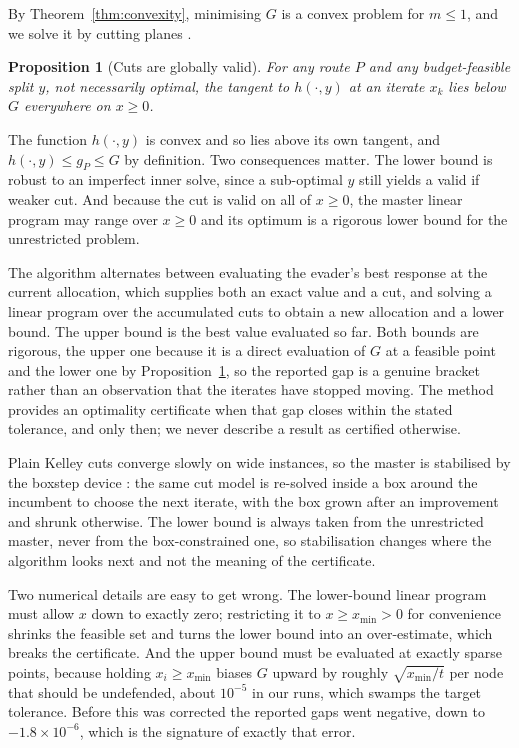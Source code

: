 \documentclass[10pt,a4paper,twoside]{article}
\theoremstyle{plain}
\newtheorem{proposition}[theorem]{Proposition}
\theoremstyle{definition}
\begin{document}
By Theorem~\ref{thm:convexity}, minimising $G$ is a convex problem for
$m\le1$, and we solve it by cutting planes \citep{kelley1960}.

\begin{proposition}[Cuts are globally valid]
\label{prop:cut-valid}
For any route $P$ and any budget-feasible split $y$, not necessarily optimal,
the tangent to $h(\cdot,y)$ at an iterate $x_k$ lies below $G$ everywhere on
$x\ge0$.
\end{proposition}

\noindent The function $h(\cdot,y)$ is convex and so lies above its own
tangent, and $h(\cdot,y)\le g_P\le G$ by definition. Two consequences
matter. The lower bound is robust to an imperfect inner solve, since a
sub-optimal $y$ still yields a valid if weaker cut. And because the cut is
valid on all of $x\ge0$, the master linear program may range over $x\ge0$ and
its optimum is a rigorous lower bound for the unrestricted problem.

The algorithm alternates between evaluating the evader's best response at the
current allocation, which supplies both an exact value and a cut, and solving
a linear program over the accumulated cuts to obtain a new allocation and a
lower bound. The upper bound is the best value evaluated so far. Both bounds
are rigorous, the upper one because it is a direct evaluation of $G$ at a
feasible point and the lower one by Proposition~\ref{prop:cut-valid}, so the
reported gap is a genuine bracket rather than an observation that the
iterates have stopped moving. The method provides an optimality certificate
when that gap closes within the stated tolerance, and only then; we never
describe a result as certified otherwise.

Plain Kelley cuts converge slowly on wide instances, so the master is
stabilised by the boxstep device \citep{marsten1975}: the same cut model is
re-solved inside a box around the incumbent to choose the next iterate, with
the box grown after an improvement and shrunk otherwise. The lower bound is
always taken from the unrestricted master, never from the box-constrained
one, so stabilisation changes where the algorithm looks next and not the
meaning of the certificate.

Two numerical details are easy to get wrong. The lower-bound linear program
must allow $x$ down to exactly zero; restricting it to $x\ge x_{\min}>0$ for
convenience shrinks the feasible set and turns the lower bound into an
over-estimate, which breaks the certificate. And the upper bound must be
evaluated at exactly sparse points, because holding $x_i\ge x_{\min}$ biases
$G$ upward by roughly $\sqrt{x_{\min}/t}$ per node that should be undefended,
about $10^{-5}$ in our runs, which swamps the target tolerance. Before this
was corrected the reported gaps went negative, down to $-1.8\times10^{-6}$,
which is the signature of exactly that error.
\end{document}
